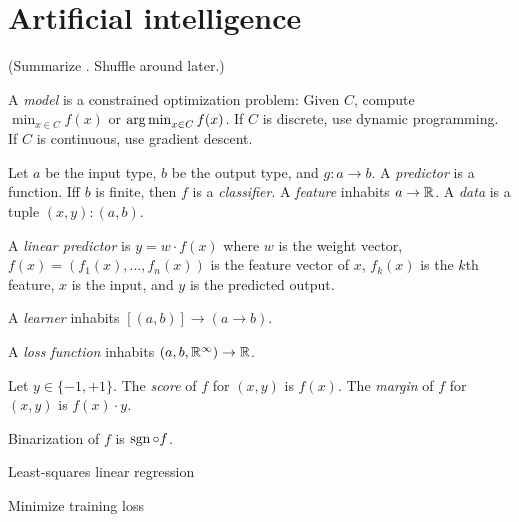 \chapter{Artificial intelligence}

(Summarize \cite{LiangCs221}. Shuffle around later.)

A
%
\emph{model} is a constrained optimization problem:
Given \(C\),
compute \(\min_{x \in C} f(x)\) or \(\operatorname{arg\,min}_{x \in C} f(x)\).
If \(C\) is discrete, use dynamic programming.
If \(C\) is continuous, use gradient descent.

Let \(a\) be the input type, \(b\) be the output type, and \(g : a \to b\).
A
%
\emph{predictor} is a function.
Iff \(b\) is finite, then \(f\) is a
%
\emph{classifier}.
A
%
\emph{feature} inhabits \(a \to \mathbb{R}\).
A
%
\emph{data} is a tuple \((x,y) : (a,b)\).

A
%
%
\emph{linear predictor} is \(y = w \cdot f(x)\) where \(w\) is the weight vector,
\(f(x) = (f_1(x),\ldots,f_n(x))\) is the feature vector of \(x\),
\(f_k(x)\) is the \(k\)th feature,
\(x\) is the input,
and \(y\) is the predicted output.

A
%
\emph{learner} inhabits \([(a,b)] \to (a \to b)\).

A
%
\emph{loss function} inhabits \((a,b,\mathbb{R}^\infty) \to \mathbb{R}\).

Let \(y \in \{-1,+1\}\).
The
%
\emph{score} of \(f\) for \((x,y)\) is \(f(x)\).
The
%
\emph{margin} of \(f\) for \((x,y)\) is \(f(x) \cdot y\).

Binarization of \(f\) is \(\operatorname{sgn} \circ f\).

Least-squares linear regression

Minimize training loss
